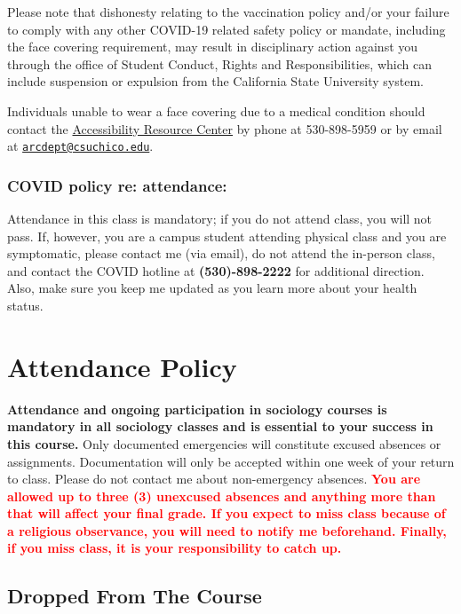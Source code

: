 \documentclass[11pt,]{article}
\begin{document}
Please note that dishonesty relating to the vaccination policy and/or
your failure to comply with any other COVID-19 related safety policy or
mandate, including the face covering requirement, may result in
disciplinary action against you through the office of Student Conduct,
Rights and Responsibilities, which can include suspension or expulsion
from the California State University system.

Individuals unable to wear a face covering due to a medical condition
should contact the \href{https://www.csuchico.edu/arc/}{Accessibility
Resource Center} by phone at 530-898-5959 or by email at
\href{mailto:arcdept@csuchico.edu}{\nolinkurl{arcdept@csuchico.edu}}.

\hypertarget{covid-policy-re-attendance}{%
\subsubsection{COVID policy re:
attendance:}\label{covid-policy-re-attendance}}

Attendance in this class is mandatory; if you do not attend class, you
will not pass. If, however, you are a campus student attending physical
class and you are symptomatic, please contact me (via email), do not
attend the in-person class, and contact the COVID hotline at
\textbf{(530)-898-2222} for additional direction. Also, make sure you
keep me updated as you learn more about your health status.

\hypertarget{attendance}{%
\section{Attendance Policy}\label{attendance}}

\textbf{Attendance and ongoing participation in sociology courses is
mandatory in all sociology classes and is essential to your success in
this course.} Only documented emergencies will constitute excused
absences or assignments. Documentation will only be accepted within one
week of your return to class. Please do not contact me about
non-emergency absences.
\textcolor{red}{\bf{You are allowed up to three (3) unexcused absences and anything more than that will affect your final grade. If you expect to miss class because of a religious observance, you will need to notify me beforehand. Finally, if you miss class, it is your responsibility to catch up.}}

\hypertarget{dropped-from-the-course}{%
\subsection{Dropped From The Course}\label{dropped-from-the-course}}
\end{document}
